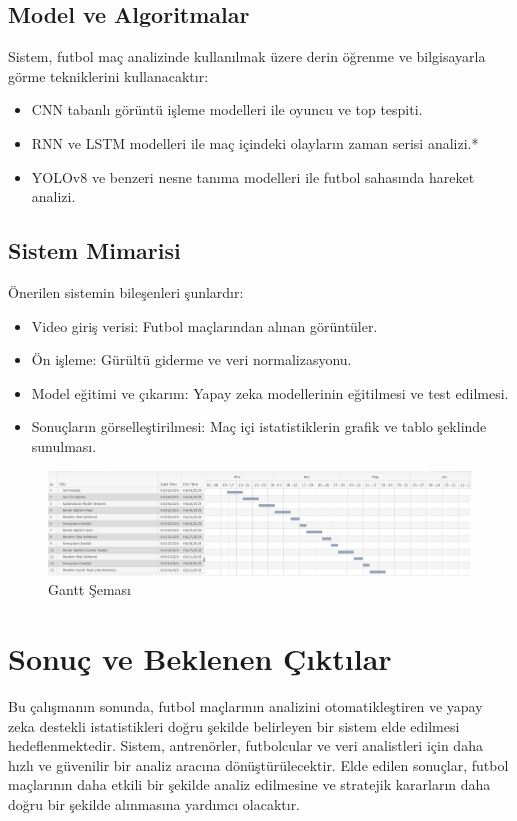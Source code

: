 \documentclass[a4paper,12pt]{article}
\begin{document}
	\subsection{Model ve Algoritmalar}
	Sistem, futbol maç analizinde kullanılmak üzere derin öğrenme ve bilgisayarla görme tekniklerini kullanacaktır:
	\begin{itemize}
		\item CNN tabanlı görüntü işleme modelleri ile oyuncu ve top tespiti.
		\item RNN ve LSTM modelleri ile maç içindeki olayların zaman serisi analizi.*
		\item YOLOv8 ve benzeri nesne tanıma modelleri ile futbol sahasında hareket analizi.
	\end{itemize}
	
	\subsection{Sistem Mimarisi}
	Önerilen sistemin bileşenleri şunlardır:
	\begin{itemize}
		\item Video giriş verisi: Futbol maçlarından alınan görüntüler.
		\item Ön işleme: Gürültü giderme ve veri normalizasyonu.
		\item Model eğitimi ve çıkarım: Yapay zeka modellerinin eğitilmesi ve test edilmesi.
		\item Sonuçların görselleştirilmesi: Maç içi istatistiklerin grafik ve tablo şeklinde sunulması.
	\end{itemize}
    
\renewcommand{\figurename}{Resim}

\begin{figure}[htp]
    \centering
    \includegraphics[width=\textwidth]{gantt_chart.png} 
    \caption{Gantt Şeması}
\end{figure}


	\section{Sonuç ve Beklenen Çıktılar}
	Bu çalışmanın sonunda, futbol maçlarının analizini otomatikleştiren ve yapay zeka destekli istatistikleri doğru şekilde belirleyen bir sistem elde edilmesi hedeflenmektedir. Sistem, antrenörler, futbolcular ve veri analistleri için daha hızlı ve güvenilir bir analiz aracına dönüştürülecektir. Elde edilen sonuçlar, futbol maçlarının daha etkili bir şekilde analiz edilmesine ve stratejik kararların daha doğru bir şekilde alınmasına yardımcı olacaktır.
\end{document}
